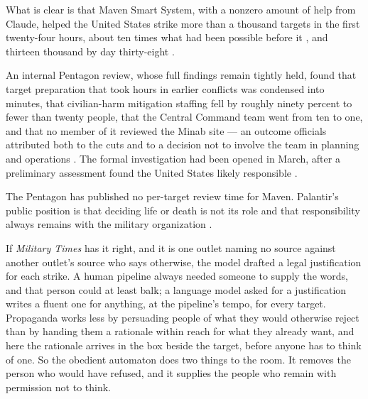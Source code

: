 What is clear is that Maven Smart System, with a nonzero amount of help from Claude, helped the United States strike more than a thousand targets in the first twenty-four hours, about ten times what had been possible before it \autocite{csis2026maven}, and thirteen thousand by day thirty-eight \autocite{breakingdefense2026maven}.

An internal Pentagon review, whose full findings remain tightly held, found that target preparation that took hours in earlier conflicts was condensed into minutes, that civilian-harm mitigation staffing fell by roughly ninety percent to fewer than twenty people, that the Central Command team went from ten to one, and that no member of it reviewed the Minab site — an outcome officials attributed both to the cuts and to a decision not to involve the team in planning and operations \autocite{Bloomberg2026KillChain}. The formal investigation had been opened in March, after a preliminary assessment found the United States likely responsible \autocite{NPR2026MinabProbe}.

The Pentagon has published no per-target review time for Maven. Palantir's public position is that deciding life or death is not its role and that responsibility always remains with the military organization \autocite{lee2026palantir}.

If \emph{Military Times} has it right, and it is one outlet naming no source against another outlet's source who says otherwise, the model drafted a legal justification for each strike. A human pipeline always needed someone to supply the words, and that person could at least balk; a language model asked for a justification writes a fluent one for anything, at the pipeline's tempo, for every target. Propaganda works less by persuading people of what they would otherwise reject than by handing them a rationale within reach for what they already want, and here the rationale arrives in the box beside the target, before anyone has to think of one. So the obedient automaton does two things to the room. It removes the person who would have refused, and it supplies the people who remain with permission not to think.

